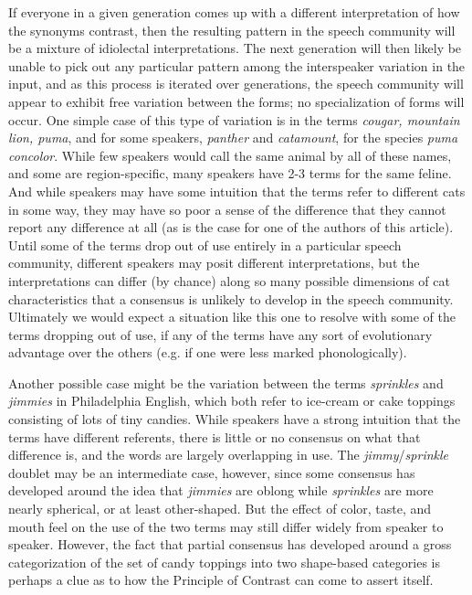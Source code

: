 If everyone in a given generation comes up with a different interpretation of how the synonyms contrast, then the resulting pattern in the speech community will be a mixture of idiolectal interpretations.
The next generation will then likely be unable to pick out any particular pattern among the interspeaker variation in the input, and as this process is iterated over generations, the speech community will appear to exhibit free variation between the forms; no specialization of forms will occur.
One simple case of this type of variation is in the terms \textsl{cougar, mountain lion, puma}, and for some speakers, \textsl{panther} and \textsl{catamount}, for the species \textsl{puma concolor}.
While few speakers would call the same animal by all of these names, and some are region-specific, many speakers have 2-3 terms for the same feline.
And while speakers may have some intuition that the terms refer to different cats in some way, they may have so poor a sense of the difference that they cannot report any difference at all (as is the case for one of the authors of this article).
Until some of the terms drop out of use entirely in a particular speech community, different speakers may posit different interpretations, but the interpretations can differ (by chance) along so many possible dimensions of cat characteristics that a consensus is unlikely to develop in the speech community.
Ultimately we would expect a situation like this one to resolve with some of the terms dropping out of use, if any of the terms have any sort of evolutionary advantage over the others (e.g. if one were less marked phonologically).

Another possible case might be the variation between the terms \textsl{sprinkles} and \textsl{jimmies} in Philadelphia English, which both refer to ice-cream or cake toppings consisting of lots of tiny candies.
While speakers have a strong intuition that the terms have different referents, there is little or no consensus on what that difference is, and the words are largely overlapping in use.
The \textsl{jimmy}/\textsl{sprinkle} doublet may be an intermediate case, however, since some consensus has developed around the idea that \textsl{jimmies} are oblong while \textsl{sprinkles} are more nearly spherical, or at least other-shaped.
But the effect of color, taste, and mouth feel on the use of the two terms may still differ widely from speaker to speaker.
However, the fact that partial consensus has developed around a gross categorization of the set of candy toppings into two shape-based categories is perhaps a clue as to how the Principle of Contrast can come to assert itself.


